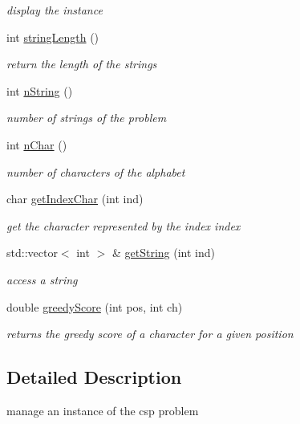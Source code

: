 \begin{DoxyCompactItemize}
\begin{DoxyCompactList}\small\item\em display the instance \end{DoxyCompactList}\item 
int \hyperlink{classInstance_a992cdeb20875e5f10b287419f4f823e6}{string\+Length} ()
\begin{DoxyCompactList}\small\item\em return the length of the strings \end{DoxyCompactList}\item 
int \hyperlink{classInstance_ab6a079ab0d6cd972707e0cdaba39ab72}{n\+String} ()
\begin{DoxyCompactList}\small\item\em number of strings of the problem \end{DoxyCompactList}\item 
int \hyperlink{classInstance_a16331a1989225c4ef9795832799b6e39}{n\+Char} ()
\begin{DoxyCompactList}\small\item\em number of characters of the alphabet \end{DoxyCompactList}\item 
char \hyperlink{classInstance_ad0323372e38c51638710c108eb364581}{get\+Index\+Char} (int ind)
\begin{DoxyCompactList}\small\item\em get the character represented by the index index \end{DoxyCompactList}\item 
std\+::vector$<$ int $>$ \& \hyperlink{classInstance_a6f2f0722ff00af749303ab0ba2243bb4}{get\+String} (int ind)
\begin{DoxyCompactList}\small\item\em access a string \end{DoxyCompactList}\item 
double \hyperlink{classInstance_a341b233c506cde815d5403976fa41aff}{greedy\+Score} (int pos, int ch)
\begin{DoxyCompactList}\small\item\em returns the greedy score of a character for a given position \end{DoxyCompactList}\end{DoxyCompactItemize}


\subsection{Detailed Description}
manage an instance of the csp problem 

